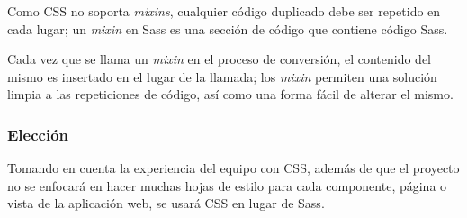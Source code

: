 Como CSS no soporta \textit{mixins}, cualquier código duplicado debe ser repetido en cada lugar; un \textit{mixin} en Sass es una sección de código que contiene código Sass. 


Cada vez que se llama un \textit{mixin} en el proceso de conversión, el contenido del mismo es insertado en el lugar de la llamada; los \textit{mixin} permiten una solución limpia a las repeticiones de código, así como una forma fácil de alterar el mismo.

\subsubsection*{Elección}

Tomando en cuenta la experiencia del equipo con CSS, además de que el proyecto no se enfocará en hacer muchas hojas de estilo para cada componente, página o vista de la aplicación web, se usará CSS en lugar de Sass.